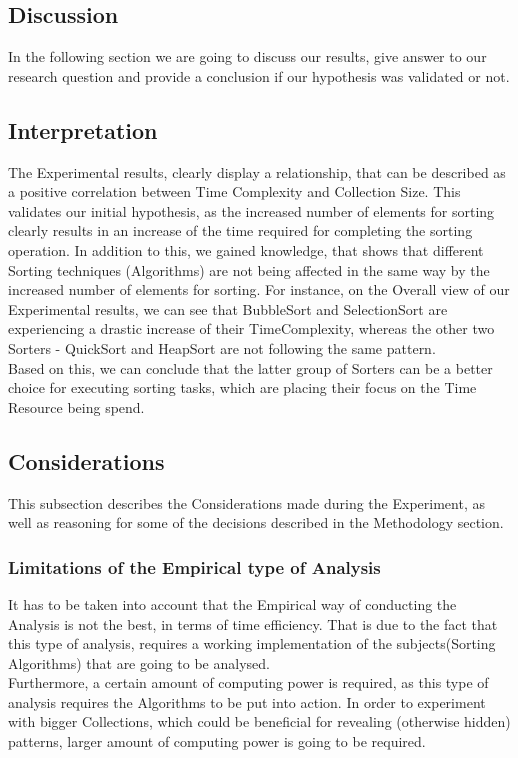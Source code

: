 \documentclass[]{report}
\begin{document}
\begin{(algorithm}
\section{Discussion}
In the following section we are going to discuss our results, give answer to our research question and provide a conclusion if our hypothesis was validated or not.
\subsection{Interpretation}
The Experimental results, clearly display a relationship, that can be described as a  positive correlation between Time Complexity and Collection Size. This validates our initial hypothesis, as the increased number of elements for sorting clearly results in an increase of the time required for completing the sorting operation. In addition to this, we gained knowledge, that shows that different Sorting techniques (Algorithms) are not being affected in the same way by the increased number of elements for sorting. For instance, on the Overall view of our Experimental results, we can see that BubbleSort and SelectionSort are experiencing a drastic increase of their TimeComplexity, whereas the other two Sorters - QuickSort and HeapSort are not following the same pattern.\\
Based on this, we can conclude that the latter group of Sorters can be a better choice for executing sorting tasks, which are placing their focus on the Time Resource being spend.
\subsection{Considerations}
This subsection describes the Considerations made during the Experiment, as well as reasoning for some of the decisions described in the Methodology section.
\subsubsection{Limitations of the Empirical type of Analysis}
It has to be taken into account that the Empirical way of conducting the Analysis is not the best, in terms of time efficiency. That is due to the fact that this type of analysis, requires a working implementation of the subjects(Sorting Algorithms) that are going to be analysed. \\
Furthermore, a certain amount of computing power is required, as this type of analysis requires the Algorithms to be put into action. In order to experiment with bigger Collections, which could be beneficial for revealing (otherwise hidden) patterns, larger amount of computing power is going to be required. 


\end{(algorithm}
\end{document}
